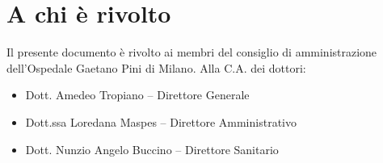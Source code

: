 %
%
\section{A chi è rivolto}
\label{abs-recipient}
Il presente documento è rivolto ai membri del consiglio di amministrazione dell'Ospedale Gaetano Pini di Milano. Alla C.A. dei dottori:

\begin{itemize}
\item{Dott. Amedeo Tropiano -- Direttore Generale}
\item{Dott.ssa Loredana Maspes -- Direttore Amministrativo}
\item{Dott. Nunzio Angelo Buccino -- Direttore Sanitario}
\end{itemize}
